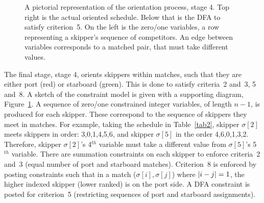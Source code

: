 \documentclass{llncs}
\DeclarePairedDelimiter\abs{\lvert}{\rvert}
\begin{document}
\begin{figure}[tb]
    \caption{A pictorial representation of the orientation process, stage 4. Top right is the actual
        oriented schedule. Below that is the DFA to satisfy criterion~5. On the left is the zero/one
        variables, a row representing a skipper's sequence of competitors. An edge between variables
        corresponds to a matched pair, that must take different values.}\label{oriented}
\end{figure}

The final stage, stage 4, orients skippers within matches, such that they are either port (red) or
starboard (green). This is done to satisfy criteria~2 and~3, 5 and~8. A sketch of the constraint
model is given with a supporting diagram, Figure~\ref{oriented}.  A sequence of zero/one constrained
integer variables, of length $n-1$, is produced for each skipper. These correspond to the sequence
of skippers they meet in matches. For example, taking the schedule in Table~\ref{tab2}, skipper
$\sigma[{2}]$ meets skippers in order: 3,0,1,4,5,6, and skipper $\sigma[{5}]$ in the order
4,6,0,1,3,2.  Therefore, skipper $\sigma[{2}]$'s 4$^{th}$ variable must take a different value from
$\sigma[{5}]$'s 5$^{th}$ variable. There are summation constraints on each skipper to enforce
criteria~2 and~3 (equal number of port and starboard matches). Criterion~8 is enforced by posting
constraints such that in a match ($\sigma[{i}],\sigma[{j}]$) where $\abs*{i - j} = 1$, the higher
indexed skipper (lower ranked) is on the port side. A DFA constraint is posted for criterion~5
(restricting sequences of port and starboard assignments).
\end{document}
